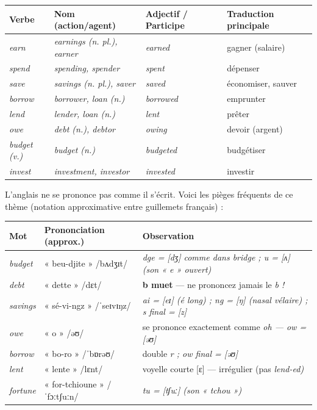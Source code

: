 \documentclass[11pt]{article}
\newcommand{\eng}[1]{\ifmmode\text{\textit{#1}}\else\begingroup\selectlanguage{english}\itshape #1\endgroup\fi}
\begin{document}
\begin{center}
\begin{tabular}{|l|l|l|l|}
\hline
\rowcolor{poppurpleL} \textbf{Verbe} & \textbf{Nom (action/agent)} & \textbf{Adjectif / Participe} & \textbf{Traduction principale} \\
\hline
\eng{earn} & \eng{earnings (n. pl.), earner} & \eng{earned} & gagner (salaire) \\
\hline
\eng{spend} & \eng{spending, spender} & \eng{spent} & dépenser \\
\hline
\eng{save} & \eng{savings (n. pl.), saver} & \eng{saved} & économiser, sauver \\
\hline
\eng{borrow} & \eng{borrower, loan (n.)} & \eng{borrowed} & emprunter \\
\hline
\eng{lend} & \eng{lender, loan (n.)} & \eng{lent} & prêter \\
\hline
\eng{owe} & \eng{debt (n.), debtor} & \eng{owing} & devoir (argent) \\
\hline
\eng{budget (v.)} & \eng{budget (n.)} & \eng{budgeted} & budgétiser \\
\hline
\eng{invest} & \eng{investment, investor} & \eng{invested} & investir \\
\hline
\end{tabular}
\end{center}

\begin{definition}
L'anglais ne se prononce pas comme il s'écrit. Voici les pièges fréquents de ce thème (notation approximative entre guillemets français) :
\end{definition}

\begin{center}
\begin{tabular}{|l|l|l|}
\hline
\rowcolor{poppinkL} \textbf{Mot} & \textbf{Prononciation (approx.)} & \textbf{Observation} \\
\hline
\eng{budget} & « beu-djite » /bʌdʒɪt/ & \eng{dge} = [dʒ] comme dans \eng{bridge} ; \eng{u} = [ʌ] (son « e » ouvert) \\
\hline
\eng{debt} & « dette » /dɛt/ & \textbf{b muet} — ne prononcez jamais le \eng{b} ! \\
\hline
\eng{savings} & « sé-vi-ngz » /ˈseɪvɪŋz/ & \eng{ai} = [eɪ] (é long) ; \eng{ng} = [ŋ] (nasal vélaire) ; \eng{s} final = [z] \\
\hline
\eng{owe} & « o » /əʊ/ & se prononce exactement comme \eng{oh} — \eng{ow} = [əʊ] \\
\hline
\eng{borrow} & « bo-ro » /ˈbɒrəʊ/ & double \eng{r} ; \eng{ow} final = [əʊ] \\
\hline
\eng{lent} & « lente » /lɛnt/ & voyelle courte [ɛ] — irrégulier (pas \eng{lend-ed}) \\
\hline
\eng{fortune} & « for-tchioune » /ˈfɔːtʃuːn/ & \eng{tu} = [tʃuː] (son « tchou ») \\
\hline
\end{tabular}
\end{center}
\end{document}
